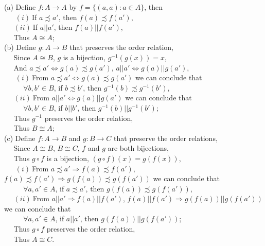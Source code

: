 \documentclass[11pt, a4paper, UTF8]{ctexart}
\begin{document}
\begin{solution}
  (a) Define $f: A \rightarrow A$ by $f = \{ (a,a): a \in A \}$, then\\
  $~~~~~~~(i)~$If $a \precsim a'$, then $f(a) \precsim f(a')$,\\
  $~~~~~~(ii)~$If $a || a'$, then $f(a) || f(a')$,\\
  $~~~~~~$Thus $A \cong A$;\\
  (b) Define $g: A \rightarrow B$ that preserves the order relation,\\
  $~~~~~~$Since $A \cong B$, $g$ is a bijection, $g^{-1}(g(x)) = x$,\\
  $~~~~~~$And $a \precsim a' \Leftrightarrow g(a) \precsim g(a')$, $a || a' \Leftrightarrow g(a) || g(a')$,\\
  $~~~~~~~(i)~$From $a \precsim a' \Leftrightarrow g(a) \precsim g(a')$ we 
  can conclude that\\
  $~~~~~~~~~~~~\forall b,b' \in B$, if $b \precsim b'$, then $g^{-1}(b) \precsim g^{-1}(b')$,\\
  $~~~~~~(ii)~$From $a || a' \Leftrightarrow g(a) || g(a')$ we can conclude that\\
  $~~~~~~~~~~~~\forall b,b' \in B$, if $b || b'$, then $g^{-1}(b) || g^{-1}(b')$;\\
  $~~~~~~$Thus $g^{-1}$ preserves the order relation,\\
  $~~~~~~$Thus $B \cong A$;\\
  (c) Define $f: A \rightarrow B$ and $g: B \rightarrow C$ that preserve the order relations,\\
  $~~~~~~$Since $A \cong B$, $B \cong C$, $f$ and $g$ are both bijections,\\
  $~~~~~~$Thus $g \circ f$ is a bijection, $(g \circ f)(x) = g(f(x))$,\\
  $~~~~~~~(i)~$From $a \precsim a' \Rightarrow f(a) \precsim f(a')$, 
  $f(a) \precsim f(a') \Rightarrow g(f(a)) \precsim g(f(a'))$ we can conclude that\\
  $~~~~~~~~~~~~\forall a,a' \in A$, if $a \precsim a'$, then $g(f(a)) \precsim g(f(a'))$,\\
  $~~~~~~(ii)~$From $a || a' \Rightarrow f(a) || f(a')$, $f(a) || f(a') \Rightarrow g(f(a)) || g(f(a'))$ 
  we can conclude that\\
  $~~~~~~~~~~~~\forall a,a' \in A$, if $a || a'$, then $g(f(a)) || g(f(a'))$;\\
  $~~~~~~$Thus $g \circ f$ preserves the order relation,\\
  $~~~~~~$Thus $A \cong C$.
\end{solution}
\end{document}
